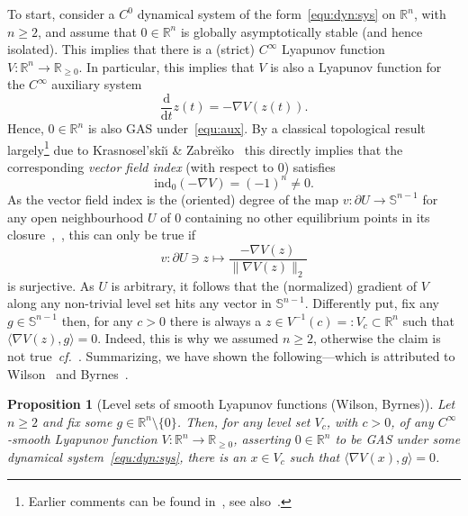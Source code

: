 \documentclass[letterpaper, 10 pt, conference]{ieeeconf}  %
\theoremstyle{mystyle}
\newtheorem{proposition}[theorem]{Proposition}
\begin{document}
To start, consider a $C^{0}$ dynamical system of the form~\eqref{equ:dyn:sys} on $\mathbb{R}^n$, with $n\geq 2$, and assume that $0\in \mathbb{R}^n$ is globally asymptotically stable (and hence isolated). This implies that there is a (strict) $C^{\infty}$ Lyapunov function $V:\mathbb{R}^n\to \mathbb{R}_{\geq 0}$. In particular, this implies that $V$ is also a Lyapunov function for the $C^{\infty}$ auxiliary system
\begin{equation}
\label{equ:aux}
    \frac{\mathrm{d}}{\mathrm{d}t}z(t) = - \nabla V(z(t)).
\end{equation}
Hence, $0\in \mathbb{R}^n$ is also GAS under~\eqref{equ:aux}. By a classical topological result largely\footnote{Earlier comments can be found in~\cite{ref:bobylev1974deformation}, see also~\cite{ref:jongeneel2023topological}.} due to Krasnosel'ski\u{\i} \& Zabre\u{\i}ko~\cite[Sec.~52]{ref:krasnosel1984geometrical} this directly implies that the corresponding \textit{vector field index} (with respect to $0$) satisfies 
\begin{equation*}
    \mathrm{ind}_0(-\nabla  V)=(-1)^n\neq 0. 
\end{equation*}
As the vector field index is the (oriented) degree of the map $v:\partial U \to \mathbb{S}^{n-1}$ for any open neighbourhood $U$ of $0$ containing no other equilibrium points in its closure~\cite[Sec.~6]{ref:milnor65},~\cite[Ch.~3]{ref:guillemin2010differential}, this can only be true if 
\begin{equation*}
    v:\partial U\ni z \mapsto \frac{-\nabla  V(z)}{\| \nabla  V(z)\|_2}
\end{equation*}
is surjective. As $U$ is arbitrary, it follows that the (normalized) gradient of $V$ along any non-trivial level set hits any vector in $\mathbb{S}^{n-1}$. Differently put, fix any $g\in \mathbb{S}^{n-1}$ then, for any $c>0$ there is always a $z\in V^{-1}(c)=: V_c\subset  \mathbb{R}^n$ such that $\langle \nabla  V(z), g \rangle =0$. Indeed, this is why we assumed $n\geq 2$, otherwise the claim is not true~\textit{cf.}~\cite[p.~121]{ref:sontag1989universal}. Summarizing, we have shown the following---which is attributed to Wilson~\cite{ref:wilson1967structure} and Byrnes~\cite[Thm.~4.1]{ref:byrnes2008brockett}.  

\begin{proposition}[Level sets of smooth Lyapunov functions (Wilson, Byrnes)]
\label{prop:Lyapunov:levelset}
Let $n\geq 2$ and fix some $g\in \mathbb{R}^n\setminus \{0\}$. Then, for any level set $V_{c}$, with $c>0$, of any $C^{\infty}$-smooth Lyapunov function $V:\mathbb{R}^n\to \mathbb{R}_{\geq 0}$, asserting $0\in \mathbb{R}^n$ to be GAS under some dynamical system~\eqref{equ:dyn:sys}, there is an $x\in V_c$ such that $\langle \nabla V(x),g \rangle =0$.  
\end{proposition}
\end{document}
